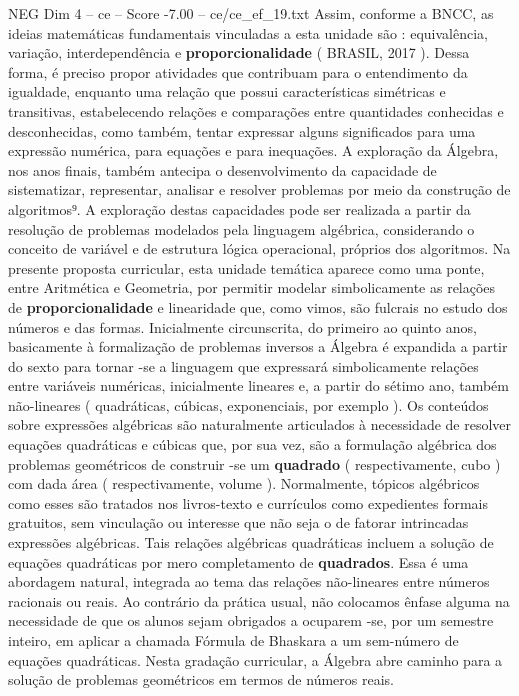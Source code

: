 \begin{textsample}{NEG Dim 4 – ce – Score -7.00 – ce/ce\_ef\_19.txt}
Assim, conforme a BNCC, as ideias matemáticas fundamentais vinculadas a esta unidade são : equivalência, variação, interdependência e \textbf{proporcionalidade} ( BRASIL, 2017 ).
Dessa forma, é preciso propor atividades que contribuam para o entendimento da igualdade, enquanto uma relação que possui características simétricas e transitivas, estabelecendo relações e comparações entre quantidades conhecidas e desconhecidas, como também, tentar expressar alguns significados para uma expressão numérica, para equações e para inequações.
A exploração da Álgebra, nos anos finais, também antecipa o desenvolvimento da capacidade de sistematizar, representar, analisar e resolver problemas por meio da construção de algoritmos⁹.
A exploração destas capacidades pode ser realizada a partir da resolução de problemas modelados pela linguagem algébrica, considerando o conceito de variável e de estrutura lógica operacional, próprios dos algoritmos.
Na presente proposta curricular, esta unidade temática aparece como uma ponte, entre Aritmética e Geometria, por permitir modelar simbolicamente as relações de \textbf{proporcionalidade} e linearidade que, como vimos, são fulcrais no estudo dos números e das formas.
Inicialmente circunscrita, do primeiro ao quinto anos, basicamente à formalização de problemas inversos a Álgebra é expandida a partir do sexto para tornar -se a linguagem que expressará simbolicamente relações entre variáveis numéricas, inicialmente lineares e, a partir do sétimo ano, também não-lineares ( quadráticas, cúbicas, exponenciais, por exemplo ).
Os conteúdos sobre expressões algébricas são naturalmente articulados à necessidade de resolver equações quadráticas e cúbicas que, por sua vez, são a formulação algébrica dos problemas geométricos de construir -se um \textbf{quadrado} ( respectivamente, cubo ) com dada área ( respectivamente, volume ).
Normalmente, tópicos algébricos como esses são tratados nos livros-texto e currículos como expedientes formais gratuitos, sem vinculação ou interesse que não seja o de fatorar intrincadas expressões algébricas.
Tais relações algébricas quadráticas incluem a solução de equações quadráticas por mero completamento de \textbf{quadrados}.
Essa é uma abordagem natural, integrada ao tema das relações não-lineares entre números racionais ou reais.
Ao contrário da prática usual, não colocamos ênfase alguma na necessidade de que os alunos sejam obrigados a ocuparem -se, por um semestre inteiro, em aplicar a chamada Fórmula de Bhaskara a um sem-número de equações quadráticas.
Nesta gradação curricular, a Álgebra abre caminho para a solução de problemas geométricos em termos de números reais.

\end{textsample}
